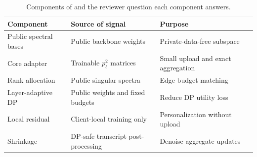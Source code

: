\begin{table}[t]
\centering
\caption{Components of \method{} and the reviewer question each component answers.}
\label{tab:components}
\begin{tabular}{lll}
\toprule
Component & Source of signal & Purpose \\
\midrule
Public spectral bases & Public backbone weights & Private-data-free subspace \\
Core adapter & Trainable $p_\ell^2$ matrices & Small upload and exact aggregation \\
Rank allocation & Public singular spectra & Edge budget matching \\
Layer-adaptive DP & Public weights and fixed budgets & Reduce DP utility loss \\
Local residual & Client-local training only & Personalization without upload \\
Shrinkage & DP-safe transcript post-processing & Denoise aggregate updates \\
\bottomrule
\end{tabular}
\end{table}
